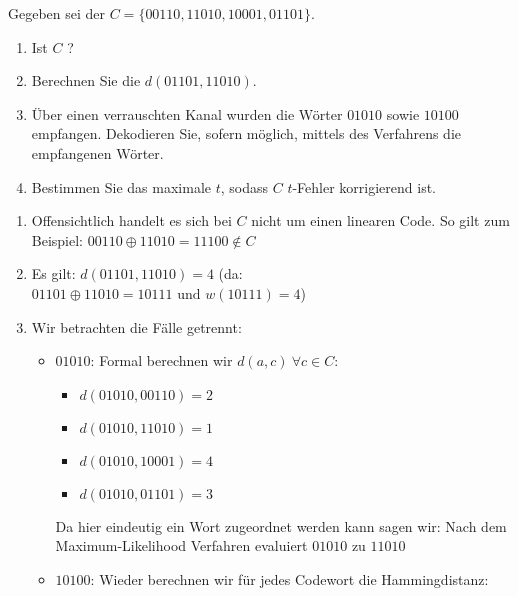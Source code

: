 
\begin{aufgabe}[Codes][4]
Gegeben sei der  $C = \{ 00110, 11010, 10001, 01101 \}$.
\begin{enumerate}[label=\alph*)]
    \item Ist $C$ ?
    \item Berechnen Sie die  $d(01101, 11010)$.
    \item Über einen verrauschten Kanal wurden die Wörter $01010$ sowie $10100$ empfangen.
    Dekodieren Sie, sofern möglich, mittels des  Verfahrens die empfangenen Wörter.
    \item Bestimmen Sie das maximale $t$, sodass $C$ $t$-Fehler korrigierend ist.
\end{enumerate}
\Splitter
\vspace{-1\baselineskip}
\begin{enumerate}[label=\alph*)]\narrowitems
    \item Offensichtlich handelt es sich bei $C$ nicht um einen linearen Code. So gilt zum Beispiel: \(00110 \oplus 11010 = 11100 \not\in C\)
    \item Es gilt: \(d(01101, 11010) = 4\) (da: \(01101 \oplus 11010 = 10111 \text{ und } w(10111) = 4\))
    \item Wir betrachten die Fälle getrennt:
    \begin{itemize}[label=--]\narrowitems
        \item $01010$: Formal berechnen wir \(d(a, c)~\forall c \in C\): \begin{multicols}{2}
            \begin{itemize}[label=]\narrowitems
                \item \(d(01010, 00110) = 2\)
                \item \(d(01010, 11010) = 1\)
                \item \(d(01010, 10001) = 4\)
                \item \(d(01010, 01101) = 3\)
            \end{itemize}
        \end{multicols}
        Da hier eindeutig ein Wort zugeordnet werden kann sagen wir: Nach dem Maximum-Likelihood Verfahren evaluiert $01010$ zu $11010$
        \item $10100$: Wieder berechnen wir für jedes Codewort die Hammingdistanz:

\end{itemize}
\end{enumerate}
\end{aufgabe}
